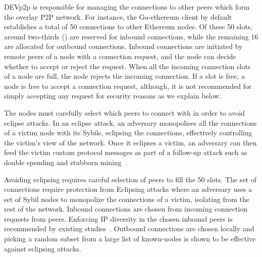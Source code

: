 DEVp2p is responsible for managing the connections to other peers which form the overlay P2P network. For instance,  the Go-ethereum client by default establishes a total of 50  connections to other Ethereum nodes.  Of these 50 slots, around two-thirds () are reserved for inbound connections,  while the remaining 16 are allocated for outbound connections. Inbound connections are initiated by remote peers of a node with a connection request, and the node can decide whether to accept or reject the request. When all the incoming connection slots of a node are full, the node rejects the incoming connection. If a slot is free, a node is free to accept a connection request, although, it is not recommended for simply accepting any request for security reasons as we explain below.

The nodes must carefully select which peers to connect with in order to avoid eclipse attacks. In an eclipse attack, an adversary monopolises all the connections of a victim node with its Sybils, \ie eclipsing the connections, effectively controlling the victim's view of the network. Once it eclipses a victim, an adversary can then feed the victim custom protocol messages as part of a follow-up attack such as double spending and stubborn mining~\cite{henningsen2019eclipsing}.

Avoiding eclipsing requires careful selection of peers to fill the 50 slots. The set of connections require protection from Eclipsing attacks where an adversary uses a set of Sybil nodes to monopolize the connections of a victim, isolating from the rest of the network. Inbound connections are chosen from incoming connection requests from peers. Enforcing IP diversity in the chosen inbound peers is recommended by existing studies~\cite{henningsen2019eclipsing, marcus2018low}. Outbound connections are chosen locally and picking a random subset from a large list of known-nodes is shown to be effective against eclipsing attacks. 


